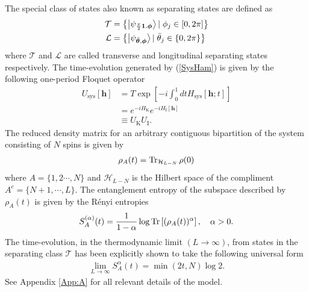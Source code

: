 \documentclass[aps,pra,reprint,amsmath,amssymb]{revtex4-2}
\newcommand{\hsys}[0]{H_{\text{sys}}}
\newcommand{\UK}[0]{U_{\text{K}}}
\newcommand{\UI}[0]{U_{\text{I}}}
\newcommand{\HK}[0]{H_{\text{K}}}
\newcommand{\HI}[0]{H_{\text{I}}}
\begin{document}
The special class of states also known as separating states are defined as
\begin{align}
    \mathcal{T}&=\left\{\ket{\psi_{\frac{\pi}{2}\bm{1}.\bm{\phi}}}|\;\phi_j \in [0,2\pi]\right\} \\
    \mathcal{L}&= \left\{\ket{\psi_{\bar{\bm{\theta}},\bm{\phi}}}|\;\bar{\theta}_j \in \{0,2\pi\}\right\}
\end{align}
where $\mathcal{T}$ and $\mathcal{L}$ are called transverse and longitudinal separating states respectively. The time-evolution generated by (\ref{SysHam}) is given by the following one-period Floquet operator
\begin{align}
\label{Flqop}
    U_{\text{sys}}[\mathbf{h}]&= T\exp \left[-i\int_0^1 dt \hsys[\bm{h};t]\right]\nonumber\\
    &=e^{-i\HK}e^{-i\HI[\bm{h}]}\\
    &\equiv \UK\UI \nonumber.
\end{align}
The reduced density matrix for an arbitrary contiguous bipartition of the system consisting of $N$ spins is given by 
\begin{align}
    \rho_A(t)=\Tr_{\mathcal{H}_{L-N}} \rho(0)
\end{align}
where $A=\{1,2\cdots,N\}$ and $\mathcal{H}_{L-N}$ is the Hilbert space of the compliment $A^c=\{N+1,\cdots,L\}$. The entanglement entropy of the subspace described by $\rho_A(t)$ is given by the Rényi entropies 
\begin{align}
    S_A^{(\alpha)}(t)=\frac{1}{1-\alpha}\log \Tr \left[(\rho_A(t))^{\alpha}\right],\quad \alpha >0.
\end{align}
The time-evolution, in the thermodynamic limit $(L \rightarrow \infty)$, from states in the separating class $\mathcal{T}$ has been explicitly shown to take the following universal form
\begin{align}
\label{universalEE}
    \lim_{L \rightarrow \infty} S_A^{\alpha}(t)= \min(2t,N)\log 2.
\end{align}
See Appendix \ref{App:A} for all relevant details of the model.
\end{document}
